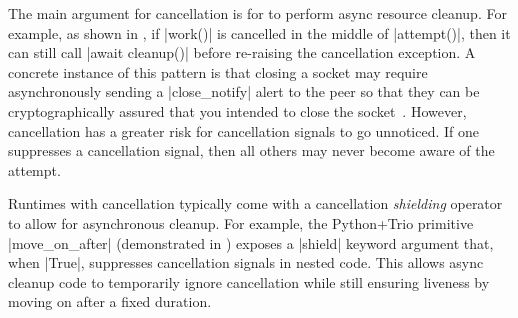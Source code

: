 The main argument for \transient cancellation is for \tasks to perform async resource cleanup. For example, as shown in , if \code|work()| is cancelled in the middle of \code|attempt()|, then it can still call \code|await cleanup()| before re-raising the cancellation exception. A concrete instance of this pattern is that closing a  socket may require asynchronously sending a \code|close_notify| alert to the peer so that they can be cryptographically assured that you intended to close the socket~.
However, \transient cancellation has a greater risk for cancellation signals to go unnoticed. If one \task suppresses a cancellation signal, then all others may never become aware of the attempt.%

Runtimes with \persistent cancellation typically come with a cancellation \emph{shielding} operator to allow for asynchronous cleanup. For example, the Python+Trio primitive \code|move_on_after| (demonstrated in ) exposes a \code|shield| keyword argument that, when \code|True|, suppresses cancellation signals in nested code. This allows async cleanup code to temporarily ignore cancellation while still ensuring liveness by moving on after a fixed duration.
